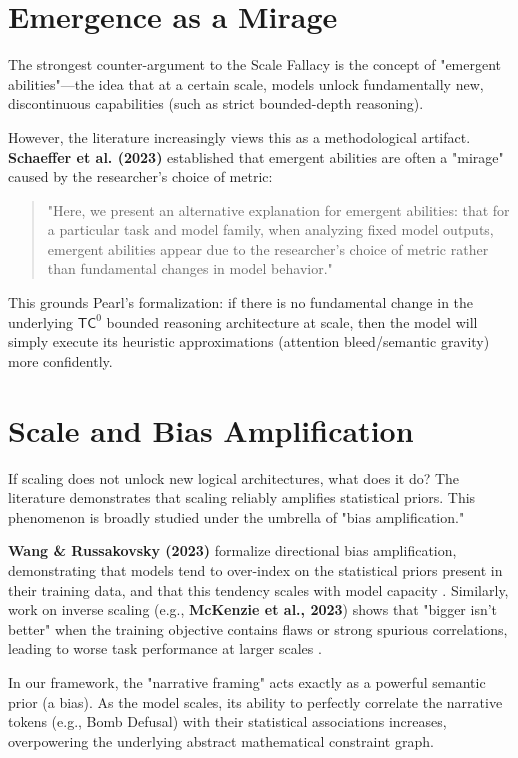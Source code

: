 \documentclass[12pt,a4paper]{article}
\begin{document}
\section{Emergence as a Mirage}

The strongest counter-argument to the Scale Fallacy is the concept of "emergent abilities"---the idea that at a certain scale, models unlock fundamentally new, discontinuous capabilities (such as strict bounded-depth reasoning).

However, the literature increasingly views this as a methodological artifact. \textbf{Schaeffer et al. (2023)} established that emergent abilities are often a "mirage" caused by the researcher's choice of metric:
\begin{quote}
"Here, we present an alternative explanation for emergent abilities: that for a particular task and model family, when analyzing fixed model outputs, emergent abilities appear due to the researcher's choice of metric rather than fundamental changes in model behavior." \citep{schaeffer2023}
\end{quote}

This grounds Pearl's formalization: if there is no fundamental change in the underlying $\mathsf{TC}^0$ bounded reasoning architecture at scale, then the model will simply execute its heuristic approximations (attention bleed/semantic gravity) more confidently.

\section{Scale and Bias Amplification}

If scaling does not unlock new logical architectures, what does it do? The literature demonstrates that scaling reliably amplifies statistical priors. This phenomenon is broadly studied under the umbrella of "bias amplification."

\textbf{Wang \& Russakovsky (2023)} formalize directional bias amplification, demonstrating that models tend to over-index on the statistical priors present in their training data, and that this tendency scales with model capacity \citep{wang2023}. Similarly, work on inverse scaling (e.g., \textbf{McKenzie et al., 2023}) shows that "bigger isn't better" when the training objective contains flaws or strong spurious correlations, leading to worse task performance at larger scales \citep{mckenzie2023}.

In our framework, the "narrative framing" acts exactly as a powerful semantic prior (a bias). As the model scales, its ability to perfectly correlate the narrative tokens (e.g., Bomb Defusal) with their statistical associations increases, overpowering the underlying abstract mathematical constraint graph.
\end{document}
